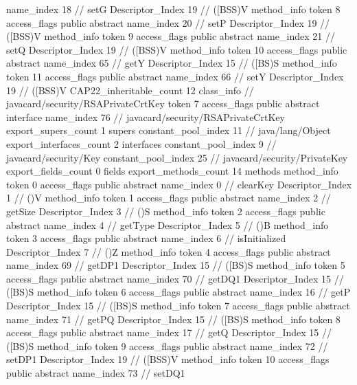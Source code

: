 {{{{{					name_index	18		// setG
					Descriptor_Index	19		// ([BSS)V
				}
				method_info {
					token	8
					access_flags	public abstract
					name_index	20		// setP
					Descriptor_Index	19		// ([BSS)V
				}
				method_info {
					token	9
					access_flags	public abstract
					name_index	21		// setQ
					Descriptor_Index	19		// ([BSS)V
				}
				method_info {
					token	10
					access_flags	public abstract
					name_index	65		// getY
					Descriptor_Index	15		// ([BS)S
				}
				method_info {
					token	11
					access_flags	public abstract
					name_index	66		// setY
					Descriptor_Index	19		// ([BSS)V
				}
			}
			CAP22_inheritable_count	12
		}
		class_info {		// javacard/security/RSAPrivateCrtKey
			token	7
			access_flags	public abstract interface
			name_index	76		// javacard/security/RSAPrivateCrtKey
			export_supers_count	1
			supers {
				constant_pool_index	11		// java/lang/Object
			}
			export_interfaces_count	2
			interfaces {
				constant_pool_index	9		// javacard/security/Key
				constant_pool_index	25		// javacard/security/PrivateKey
			}
			export_fields_count	0
			fields {
			}
			export_methods_count	14
			methods {
				method_info {
					token	0
					access_flags	public abstract
					name_index	0		// clearKey
					Descriptor_Index	1		// ()V
				}
				method_info {
					token	1
					access_flags	public abstract
					name_index	2		// getSize
					Descriptor_Index	3		// ()S
				}
				method_info {
					token	2
					access_flags	public abstract
					name_index	4		// getType
					Descriptor_Index	5		// ()B
				}
				method_info {
					token	3
					access_flags	public abstract
					name_index	6		// isInitialized
					Descriptor_Index	7		// ()Z
				}
				method_info {
					token	4
					access_flags	public abstract
					name_index	69		// getDP1
					Descriptor_Index	15		// ([BS)S
				}
				method_info {
					token	5
					access_flags	public abstract
					name_index	70		// getDQ1
					Descriptor_Index	15		// ([BS)S
				}
				method_info {
					token	6
					access_flags	public abstract
					name_index	16		// getP
					Descriptor_Index	15		// ([BS)S
				}
				method_info {
					token	7
					access_flags	public abstract
					name_index	71		// getPQ
					Descriptor_Index	15		// ([BS)S
				}
				method_info {
					token	8
					access_flags	public abstract
					name_index	17		// getQ
					Descriptor_Index	15		// ([BS)S
				}
				method_info {
					token	9
					access_flags	public abstract
					name_index	72		// setDP1
					Descriptor_Index	19		// ([BSS)V
				}
				method_info {
					token	10
					access_flags	public abstract
					name_index	73		// setDQ1
}}}}}
